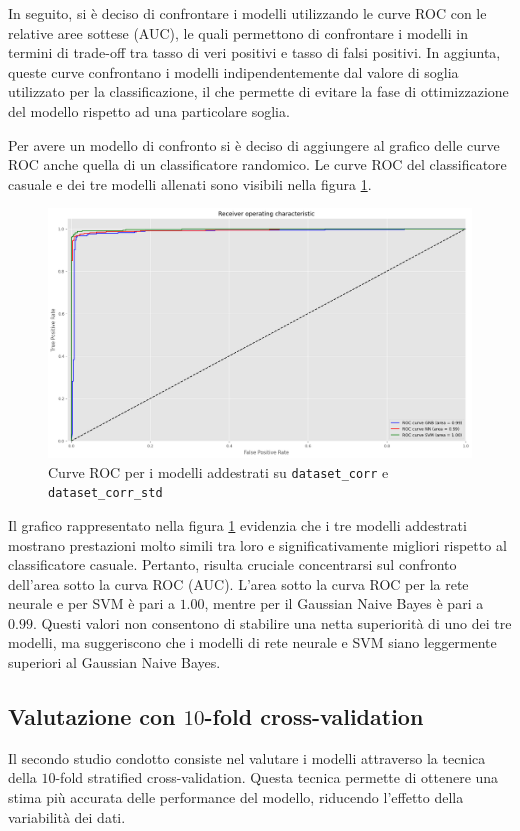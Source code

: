 In seguito, si è deciso di confrontare i modelli utilizzando le curve ROC con
le relative aree sottese (AUC), le quali permettono di confrontare i modelli in
termini di trade-off tra tasso di veri positivi e tasso di falsi positivi. In
aggiunta, queste curve confrontano i modelli indipendentemente dal valore di
soglia utilizzato per la classificazione, il che permette di evitare la fase di
ottimizzazione del modello rispetto ad una particolare soglia.

Per avere un modello di confronto si è deciso di aggiungere al grafico delle
curve ROC anche quella di un classificatore randomico. Le curve ROC del
classificatore casuale e dei tre modelli allenati sono visibili nella figura
\ref{fig:roc_curve_corr}.
\begin{figure}[!ht]
    \centering
    \includegraphics[width=\textwidth]{img/ris/roc_curve_corr.png}
    \caption{Curve ROC per i modelli addestrati su \texttt{dataset\_corr} e \texttt{dataset\_corr\_std}}
    \label{fig:roc_curve_corr}
\end{figure}

Il grafico rappresentato nella figura \ref{fig:roc_curve_corr} evidenzia che i
tre modelli addestrati mostrano prestazioni molto simili tra loro e
significativamente migliori rispetto al classificatore casuale. Pertanto, risulta
cruciale concentrarsi sul confronto dell'area sotto la curva ROC (AUC). L'area
sotto la curva ROC per la rete neurale e per SVM è pari a $1.00$, mentre per il
Gaussian Naive Bayes è pari a $0.99$. Questi valori non consentono di stabilire
una netta superiorità di uno dei tre modelli, ma suggeriscono che i modelli di
rete neurale e SVM siano leggermente superiori al Gaussian Naive Bayes.
\subsection{Valutazione con $10$-fold cross-validation}
Il secondo studio condotto consiste nel valutare i modelli attraverso la tecnica
della $10$-fold stratified cross-validation. Questa tecnica permette di ottenere
una stima più accurata delle performance del modello, riducendo l'effetto della
variabilità dei dati.

